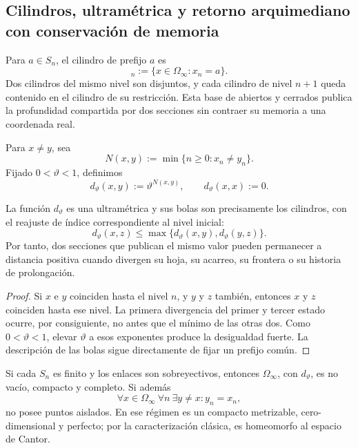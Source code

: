 \subsection{Cilindros, ultramétrica y retorno arquimediano con conservación de memoria}

Para \(a\in S_n\), el cilindro de prefijo \(a\) es
\begin{equation}
 [a]_n:=\{x\in\Omega_\infty:x_n=a\}.
 \label{eq:cilindro-genealogico-rev3}
\end{equation}
Dos cilindros del mismo nivel son disjuntos, y cada cilindro de nivel
\(n+1\) queda contenido en el cilindro de su restricción. Esta base de
abiertos y cerrados publica la profundidad compartida por dos secciones sin
contraer su memoria a una coordenada real.

Para \(x\neq y\), sea
\[
 N(x,y):=\min\{n\geq0:x_n\neq y_n\}.
\]
Fijado \(0<\vartheta<1\), definimos
\begin{equation}
 d_\vartheta(x,y):=\vartheta^{N(x,y)},
 \qquad d_\vartheta(x,x):=0.
 \label{eq:ultrametrica-genealogica-rev3}
\end{equation}

\begin{proposition}
\label{prop:ultrametrica-genealogica-rev3}
La función \(d_\vartheta\) es una ultramétrica y sus bolas son precisamente
los cilindros, con el reajuste de índice correspondiente al nivel inicial:
\[
 d_\vartheta(x,z)
 \leq
 \max\{d_\vartheta(x,y),d_\vartheta(y,z)\}.
\]
Por tanto, dos secciones que publican el mismo valor pueden permanecer a
distancia positiva cuando divergen su hoja, su acarreo, su frontera o su
historia de prolongación.
\end{proposition}

\begin{proof}
Si \(x\) e \(y\) coinciden hasta el nivel \(n\), y \(y\) y \(z\) también,
entonces \(x\) y \(z\) coinciden hasta ese nivel. La primera divergencia del
primer y tercer estado ocurre, por consiguiente, no antes que el mínimo de
las otras dos. Como \(0<\vartheta<1\), elevar \(\vartheta\) a esos
exponentes produce la desigualdad fuerte. La descripción de las bolas sigue
directamente de fijar un prefijo común.
\end{proof}

\begin{theorem}
\label{thm:compacidad-ultrametrica-genealogica-rev3}
Si cada \(S_n\) es finito y los enlaces son sobreyectivos, entonces
\(\Omega_\infty\), con \(d_\vartheta\), es no vacío, compacto y completo.
Si además
\begin{equation}
 \forall x\in\Omega_\infty\ \forall n\ \exists y\neq x:
 y_n=x_n,
 \label{eq:perfeccion-genealogica-rev3}
\end{equation}
no posee puntos aislados. En ese régimen es un compacto metrizable,
cero-dimensional y perfecto; por la caracterización clásica, es homeomorfo
al espacio de Cantor.
\end{theorem}

